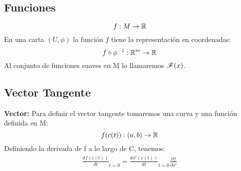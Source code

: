 \documentclass{report}
\begin{document}
  \subsection*{Funciones}
  \[
    f: M \rightarrow \mathbb{R}
  \]
  En una carta $(U,\phi)$ la función $f$ tiene la representación en coordenadas:
  \[
    f \circ \phi ^{-1}:\mathbb{R}^m\rightarrow\mathbb{R}
  \]
  Al conjunto de funciones suaves en M lo llamaremos $\mathscr{F}(x)$.
    \subsection{Vector Tangente}
    \textbf{Vector:} Para definir el vector tangente tomaremos una curva y una función definida en M:
    \[
      f(c(t)):(a,b)\rightarrow \mathbb{R}
    \]
  Definiendo la derivada de f a lo largo de C, tenemos:
  \begin{gather*}
    \frac{d f(c(t )) }{d t}_{t=0}=\frac{d x^i(c(t)) }{d t}_{t=0} \frac{\partial f }{\partial x^i}
  \end{gather*}
\end{document}

